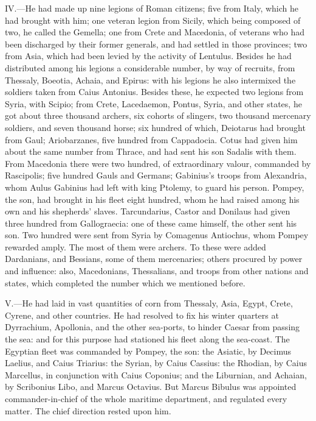 IV.—He had made up nine legions of Roman citizens; five from Italy,
which he had brought with him; one veteran legion from Sicily, which
being composed of two, he called the Gemella; one from Crete and
Macedonia, of veterans who had been discharged by their former generals,
and had settled in those provinces; two from Asia, which had been levied
by the activity of Lentulus. Besides he had distributed among his
legions a considerable number, by way of recruits, from Thessaly,
Boeotia, Achaia, and Epirus: with his legions he also intermixed the
soldiers taken from Caius Antonius. Besides these, he expected two
legions from Syria, with Scipio; from Crete, Lacedaemon, Pontus, Syria,
and other states, he got about three thousand archers, six cohorts of
slingers, two thousand mercenary soldiers, and seven thousand horse; six
hundred of which, Deiotarus had brought from Gaul; Ariobarzanes, five
hundred from Cappadocia. Cotus had given him about the same number from
Thrace, and had sent his son Sadalis with them. From Macedonia there
were two hundred, of extraordinary valour, commanded by Rascipolis; five
hundred Gauls and Germans; Gabinius's troops from Alexandria, whom Aulus
Gabinius had left with king Ptolemy, to guard his person. Pompey, the
son, had brought in his fleet eight hundred, whom he had raised among
his own and his shepherds' slaves. Tarcundarius, Castor and Donilaus had
given three hundred from Gallograecia: one of these came himself, the
other sent his son. Two hundred were sent from Syria by Comagenus
Antiochus, whom Pompey rewarded amply. The most of them were archers. To
these were added Dardanians, and Bessians, some of them mercenaries;
others procured by power and influence: also, Macedonians, Thessalians,
and troops from other nations and states, which completed the number
which we mentioned before.

V.—He had laid in vast quantities of corn from Thessaly, Asia, Egypt,
Crete, Cyrene, and other countries. He had resolved to fix his winter
quarters at Dyrrachium, Apollonia, and the other sea-ports, to hinder
Caesar from passing the sea: and for this purpose had stationed his
fleet along the sea-coast. The Egyptian fleet was commanded by Pompey,
the son: the Asiatic, by Decimus Laelius, and Caius Triarius: the
Syrian, by Caius Cassius: the Rhodian, by Caius Marcellus, in
conjunction with Caius Coponius; and the Liburnian, and Achaian, by
Scribonius Libo, and Marcus Octavius. But Marcus Bibulus was appointed
commander-in-chief of the whole maritime department, and regulated every
matter. The chief direction rested upon him.

